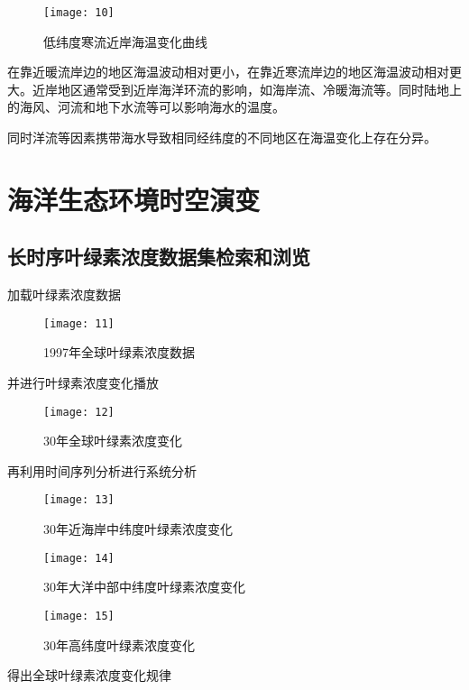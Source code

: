 \documentclass{source/Report}
\begin{document}
\begin{figure}[H]
    \centering
    \texttt{[image: 10]}
    \caption{低纬度寒流近岸海温变化曲线}
\end{figure}

在靠近暖流岸边的地区海温波动相对更小，在靠近寒流岸边的地区海温波动相对更大。近岸地区通常受到近岸海洋环流的影响，如海岸流、冷暖海流等。同时陆地上的海风、河流和地下水流等可以影响海水的温度。

同时洋流等因素携带海水导致相同经纬度的不同地区在海温变化上存在分异。

\section{海洋生态环境时空演变}

\subsection{长时序叶绿素浓度数据集检索和浏览}

加载叶绿素浓度数据

\begin{figure}[H]
    \centering
    \texttt{[image: 11]}
    \caption{1997年全球叶绿素浓度数据}
\end{figure}

并进行叶绿素浓度变化播放

\begin{figure}[H]
    \centering
    \texttt{[image: 12]}
    \caption{30年全球叶绿素浓度变化}
\end{figure}

再利用时间序列分析进行系统分析

\begin{figure}[H]
    \centering
    \texttt{[image: 13]}
    \caption{30年近海岸中纬度叶绿素浓度变化}
\end{figure}

\begin{figure}[H]
    \centering
    \texttt{[image: 14]}
    \caption{30年大洋中部中纬度叶绿素浓度变化}
\end{figure}

\begin{figure}[H]
    \centering
    \texttt{[image: 15]}
    \caption{30年高纬度叶绿素浓度变化}
\end{figure}

得出全球叶绿素浓度变化规律
\end{document}
